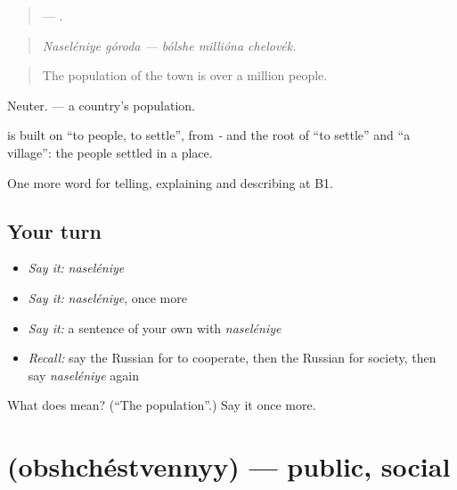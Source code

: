 \begin{quote}
  —   .
\end{quote}

\begin{quote}
\emph{Naseléniye góroda — bólshe millióna chelovék.}
\end{quote}

\begin{quote}
The population of the town is over a million people.
\end{quote}

Neuter. \emph{ } — a country’s population.

\begin{cousinweb}
\textbf{} is built on \emph{} \textquotedblleft{}to people, to settle\textquotedblright{}, from \emph{-} and the root of \emph{} \textquotedblleft{}to settle\textquotedblright{} and \emph{} \textquotedblleft{}a village\textquotedblright{}: the people settled in a place.
\end{cousinweb}

\begin{grammarlens}[title={What you've built}]
One more word for telling, explaining and describing at B1.
\end{grammarlens}

\subsection*{Your turn}
\begin{itemize}
\raggedright
  \item \emph{Say it:} \emph{naseléniye}
  \item \emph{Say it:} \emph{naseléniye}, once more
  \item \emph{Say it:} a sentence of your own with \emph{naseléniye}
  \item \emph{Recall:} say the Russian for to cooperate, then the Russian for society, then say \emph{naseléniye} again
\end{itemize}

\begin{tcolorbox}[breakable,colback=teal!4,colframe=teal!35!black,title={Before you move on}]
What does  mean? (\textquotedblleft{}The population\textquotedblright{}.) Say it once more.
\end{tcolorbox}
\section[\texorpdfstring{\ru{общественный} (obshchéstvennyy)}{общественный (obshchéstvennyy)}]{ (obshchéstvennyy) — public, social}

